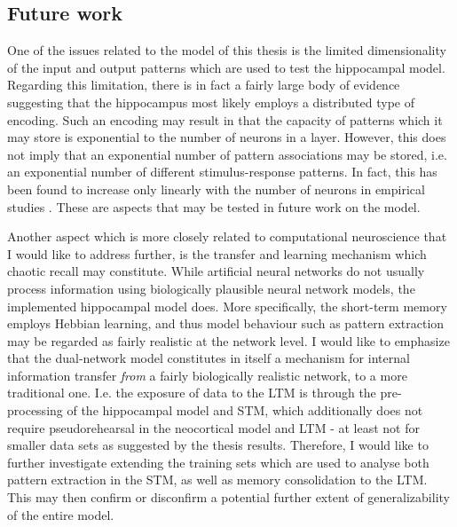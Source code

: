 


\subsection*{Future work}


One of the issues related to the model of this thesis is the limited dimensionality of the input and output patterns which are used to test the hippocampal model. Regarding this limitation, there is in fact a fairly large body of evidence suggesting that the hippocampus most likely employs a distributed type of encoding. Such an encoding may result in that the capacity of patterns which it may store is exponential to the number of neurons in a layer.
However, this does not imply that an exponential number of pattern associations may be stored, i.e. an exponential number of different stimulus-response patterns. In fact, this has been found to increase only linearly with the number of neurons in empirical studies \citep{Rolls1998chpt6}. These are aspects that may be tested in future work on the model.

Another aspect which is more closely related to computational neuroscience that I would like to address further, is the transfer and learning mechanism which chaotic recall may constitute.
While artificial neural networks do not usually process information using biologically plausible neural network models, the implemented hippocampal model does. More specifically, the short-term memory employs Hebbian learning, and thus model behaviour such as pattern extraction may be regarded as fairly realistic at the network level.
I would like to emphasize that the dual-network model constitutes in itself a mechanism for internal information transfer \textit{from} a fairly biologically realistic network, to a more traditional one. I.e. the exposure of data to the LTM is through the pre-processing of the hippocampal model and STM, which additionally does not require pseudorehearsal in the neocortical model and LTM - at least not for smaller data sets as suggested by the thesis results. Therefore, I would like to further investigate extending the training sets which are used to analyse both pattern extraction in the STM, as well as memory consolidation to the LTM. This may then confirm or disconfirm a potential further extent of generalizability of the entire model.

